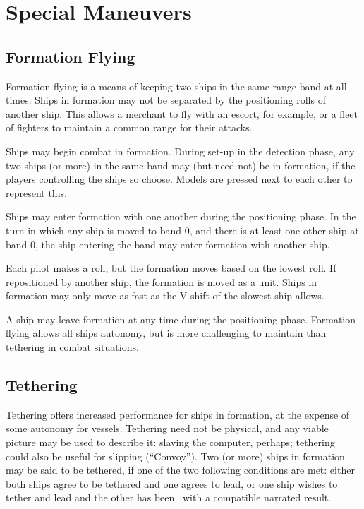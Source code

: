 \section{Special Maneuvers}
\label{sec:special-maneuvers}

\subsection{Formation Flying}
\label{sec:formation-flying}

Formation flying is a means of keeping two ships in the same range band at all times. Ships in formation may not be separated by the positioning rolls of another ship. This allows a merchant to fly with an escort, for example, or a fleet of fighters to maintain a common range for their attacks.

Ships may begin combat in formation. During set-up in the detection phase, any two ships (or more) in the same band may (but need not) be in formation, if the players controlling the ships so choose. Models are pressed next to each other to represent this.

Ships may enter formation with one another during the positioning phase. In the turn in which any ship is moved to band 0, and there is at least one other ship at band 0, the ship entering the band may enter formation with another ship.

Each pilot makes a roll, but the formation moves based on the lowest roll. If repositioned by another ship, the formation is moved as a unit. Ships in formation may only move as fast as the V-shift of the slowest ship allows.

A ship may leave formation at any time during the positioning phase. Formation flying allows all ships autonomy, but is more challenging to maintain than tethering in combat situations.

\subsection{Tethering}
\label{sec:tethering}

Tethering offers increased performance for ships in formation, at the expense of some autonomy for vessels. Tethering need not be physical, and any viable picture may be used to describe it: slaving the computer, perhaps; tethering could also be useful for slipping (``Convoy''). Two (or more) ships in formation may be said to be tethered, if one of the two following conditions are met: either both ships agree to be tethered and one agrees to lead, or one ship wishes to tether and lead and the other has been \TakenOut\ with a compatible narrated result.

